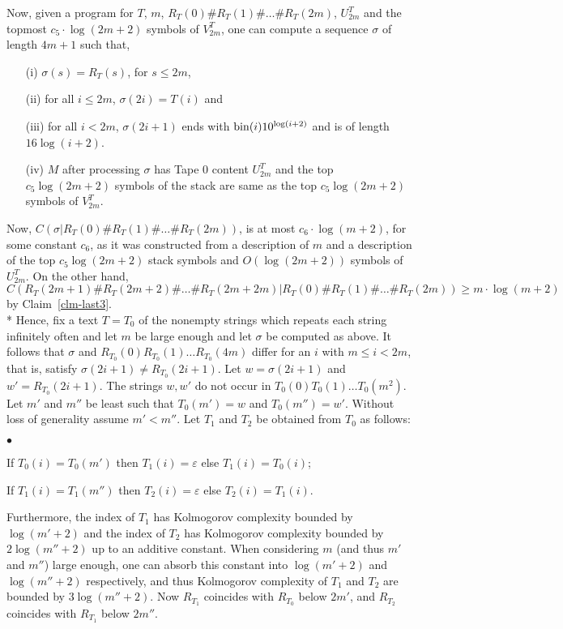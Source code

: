 \documentclass{LMCS}
\newcommand{\bin}{{\rm bin}}
\theoremstyle{plain}\newtheorem{athm}[thm]{Theorem}
\theoremstyle{plain}\newtheorem{aprop}[thm]{Proposition}
\theoremstyle{plain}\newtheorem{aprob}[thm]{Open Problem}
\theoremstyle{plain}\newtheorem{acor}[thm]{Corollary}
\theoremstyle{plain}\newtheorem{alem}[thm]{Lemma}
\theoremstyle{definition}\newtheorem{adefn}[thm]{Definition}
\theoremstyle{definition}\newtheorem{arem}[thm]{Remark}
\theoremstyle{plain}\newtheorem{aexmp}[thm]{Example}
\theoremstyle{plain}\newtheorem{aclm}[thm]{Claim}
\def\sp{\\*\indent}
\begin{document}
Now, given a program for $T$, $m$,
$R_T(0)\#R_T(1)\# \ldots\# R_T(2m)$,
$U^T_{2m}$ and the topmost $c_5 \cdot \log(2m+2)$ symbols
of $V^T_{2m}$, one can compute a sequence $\sigma$ of length $4m+1$
such that,
\begin{enumerate}[(i)]
\item[(i)] $\sigma(s)=R_T(s)$, for $s \leq 2m$,
\item[(ii)] for all $i \leq 2m$, $\sigma(2i) = T(i)$ and
\item[(iii)] for all $i<2m$, 
   $\sigma(2i+1)$ ends with $\bin(i)10^{\log(i+2)}$ and is of length
   $16 \log (i+2)$.  
\item[(iv)] $M$ after processing
$\sigma$ has Tape $0$ content $U_{2m}^T$ and
the top $c_5 \log(2m+2)$ symbols of the stack are same as the
top $c_5 \log(2m+2)$ symbols of $V_{2m}^T$.
\end{enumerate}
Now, $C(\sigma| R_T(0)\#R_T(1)\#\ldots \# R_T(2m))$, is at most 
$c_6 \cdot \log(m+2)$, for some constant $c_6$,
as it was constructed from a description of $m$ and a description of the top
$c_5 \log(2m+2)$ stack symbols and $O(\log(2m+2))$ symbols of $U_{2m}^T$.
On the other hand, 
$C(R_T(2m+1)\#R_T(2m+2)\# \ldots \#R_T(2m+2m)
 | R_T(0)\#R_T(1)\#\ldots \# R_T(2m))
\geq m \cdot \log(m+2)$ by Claim~\ref{clm-last3}.
\sp
Hence, fix a text $T=T_0$ of the nonempty strings which repeats each
string infinitely often
and let $m$ be large enough and let $\sigma$ be computed as above.
It follows that $\sigma$ and $R_{T_0}(0)R_{T_0}(1)\ldots R_{T_0}(4m)$ 
differ for an $i$ with $m \leq i < 2m$, that is, satisfy
$\sigma(2i+1) \neq R_{T_0}(2i+1)$. Let $w = \sigma(2i+1)$ and
$w' = R_{T_0}(2i+1)$. The strings $w,w'$ do not occur in $T_0(0) T_0(1)\ldots
T_0(m^2)$. Let $m'$ and $m''$ be least such that $T_0(m')=w$ and $T_0(m'')=w'$.
Without loss of generality assume $m'<m''$.
Let $T_1$ and $T_2$ be obtained from $T_0$ as follows:
\begin{iteMize}{$\bullet$}
\item If $T_0(i) = T_0(m')$ then 
$T_1(i) = \varepsilon$ else $T_1(i) = T_0(i)$;
\item If $T_1(i)=T_1(m'')$ then
$T_2(i) = \varepsilon$ else $T_2(i) = T_1(i)$.
\end{iteMize}
Furthermore, the index of $T_1$ has Kolmogorov complexity bounded by
$\log(m'+2)$ and the index of $T_2$ has Kolmogorov complexity bounded
by $2\log(m''+2)$ up to an additive constant. 
When considering $m$ (and thus $m'$ and $m''$) large 
enough, one can absorb this constant into $\log(m'+2)$ and $\log(m''+2)$
respectively, and thus
Kolmogorov complexity of $T_1$ and $T_2$ are bounded by $3\log(m''+2)$.
Now $R_{T_1}$ coincides with $R_{T_0}$ below $2m'$, and
$R_{T_2}$ coincides with $R_{T_1}$ below $2m''$.
\end{document}
